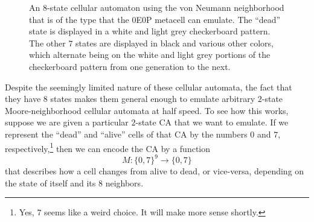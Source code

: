 \begin{figure}[!htb]
	\centering
	    
	\caption{An $8$-state cellular automaton using the von Neumann neighborhood that is of the type that the 0E0P metacell can emulate. The ``dead'' state is displayed in a white and light grey checkerboard pattern. The other $7$ states are displayed in black and various other colors, which alternate being on the white and light grey portions of the checkerboard pattern from one generation to the next.}\label{fig:0e0p_checkerboard}
\end{figure}

Despite the seemingly limited nature of these cellular automata, the fact that they have $8$ states makes them general enough to emulate arbitrary $2$-state Moore-neighborhood cellular automata at half speed. To see how this works, suppose we are given a particular $2$-state CA that we want to emulate. If we represent the ``dead'' and ``alive'' cells of that CA by the numbers $0$ and $7$, respectively,\footnote{Yes, $7$ seems like a weird choice. It will make more sense shortly.} then we can encode the CA by a function
\[
	M : \{ 0, 7 \}^9 \rightarrow \{0, 7\}
\]
that describes how a cell changes from alive to dead, or vice-versa, depending on the state of itself and its $8$ neighbors.

